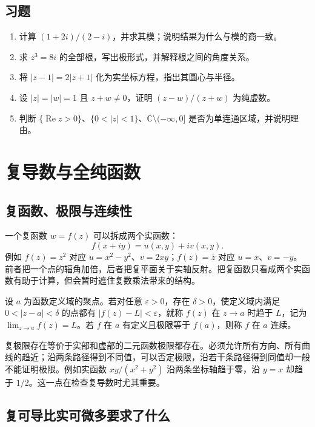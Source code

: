\documentclass[UTF8,12pt,a4paper,fontset=fandol]{ctexbook}
\begin{document}
\section{习题}
\label{sec:cv-plane-ex}
\begin{enumerate}
 \item 计算 $(1+2i)/(2-i)$，并求其模；说明结果为什么与模的商一致。
 \item 求 $z^3=8i$ 的全部根，写出极形式，并解释根之间的角度关系。
 \item 将 $|z-1|=2|z+1|$ 化为实坐标方程，指出其圆心与半径。
 \item 设 $|z|=|w|=1$ 且 $z+w\ne0$，证明 $(z-w)/(z+w)$ 为纯虚数。
 \item 判断 $\{\operatorname{Re}z>0\}$、$\{0<|z|<1\}$、$\mathbb C\setminus(-\infty,0]$ 是否为单连通区域，并说明理由。
\end{enumerate}

\chapter{复导数与全纯函数}
\label{chap:cv-derivative}

\section{复函数、极限与连续性}

一个复函数 $w=f(z)$ 可以拆成两个实函数：
\[
 f(x+iy)=u(x,y)+iv(x,y).
\]
例如 $f(z)=z^2$ 对应 $u=x^2-y^2$、$v=2xy$；$f(z)=\overline z$ 对应 $u=x$、$v=-y$。前者把一个点的辐角加倍，后者把复平面关于实轴反射。把复函数只看成两个实函数有助于计算，但会暂时遮住复数乘法带来的结构。

\begin{definition}[复极限]
设 $a$ 为函数定义域的聚点。若对任意 $\varepsilon>0$，存在 $\delta>0$，使定义域内满足 $0<|z-a|<\delta$ 的点都有 $|f(z)-L|<\varepsilon$，就称 $f(z)$ 在 $z\to a$ 时趋于 $L$，记为 $\lim_{z\to a}f(z)=L$。若 $f$ 在 $a$ 有定义且极限等于 $f(a)$，则称 $f$ 在 $a$ 连续。
\end{definition}

复极限存在等价于实部和虚部的二元函数极限都存在。必须允许所有方向、所有曲线的趋近；沿两条路径得到不同值，可以否定极限，沿若干条路径得到同值却一般不能证明极限。例如实函数 $xy/(x^2+y^2)$ 沿两条坐标轴趋于零，沿 $y=x$ 却趋于 $1/2$。这一点在检查复导数时尤其重要。

\section{复可导比实可微多要求了什么}
\end{document}
